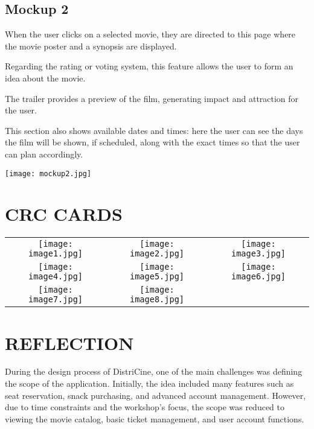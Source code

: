 \documentclass[12pt, letterpaper]{article}
\begin{document}
\newpage
\begin{samepage}
\subsection*{Mockup 2}
When the user clicks on a selected movie, they are directed to this page where the movie poster and a synopsis are displayed.

Regarding the rating or voting system, this feature allows the user to form an idea about the movie.

The trailer provides a preview of the film, generating impact and attraction for the user.

This section also shows available dates and times: here the user can see the days the film will be shown, if scheduled, along with the exact times so that the user can plan accordingly.

\begin{center}
    \texttt{[image: mockup2.jpg]}
\end{center}
\end{samepage}

\section{CRC CARDS}
\begin{center}
\begin{tabular}{ccc}
    \texttt{[image: image1.jpg]} &
    \texttt{[image: image2.jpg]} &
    \texttt{[image: image3.jpg]} \\
    \texttt{[image: image4.jpg]} &
    \texttt{[image: image5.jpg]} &
    \texttt{[image: image6.jpg]} \\
    \texttt{[image: image7.jpg]} &
    \texttt{[image: image8.jpg]} &
\end{tabular}
\end{center}

\section{REFLECTION}

During the design process of DistriCine, one of the main challenges was defining the scope of the application. Initially, the idea included many features such as seat reservation, snack purchasing, and advanced account management. However, due to time constraints and the workshop’s focus, the scope was reduced to viewing the movie catalog, basic ticket management, and user account functions.
\end{document}
